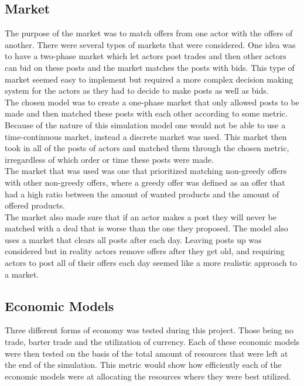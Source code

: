 \documentclass[11p]{article}
\begin{document}
\subsection{Market}

The purpose of the market was to match offers from one actor with the offers of another. There were several types of markets that were considered. One idea was to have a two-phase market which let actors post trades and then other actors can bid on these posts and the market matches the posts with bids. This type of market seemed easy to implement but required a more complex decision making system for the actors as they had to decide to make posts as well as bids.
\\
The chosen model was to create a one-phase market that only allowed posts to be made and then matched these posts with each other according to some metric. Because of the nature of this simulation model one would not be able to use a time-continuous market, instead a discrete market was used. This market then took in all of the posts of actors and matched them through the chosen metric, irregardless of which order or time these posts were made.
\\

The market that was used was one that prioritized matching non-greedy offers with other non-greedy offers, where a greedy offer was defined as an offer that had a high ratio between the amount of wanted products and the amount of offered products. 
\\
The market also made sure that if an actor makes a post they will never be matched with a deal that is worse than the one they proposed.
The model also uses a market that clears all posts after each day. Leaving posts up was considered but in reality actors remove offers after they get old, and requiring actors to post all of their offers each day seemed like a more realistic approach to a market.

\subsection{Economic Models}

Three different forms of economy was tested during this project. Those being no trade, barter trade and the utilization of currency. Each of these economic models were then tested on the basis of the total amount of resources that were left at the end of the simulation. This metric would show how efficiently each of the economic models were at allocating the resources where they were best utilized.
\end{document}
